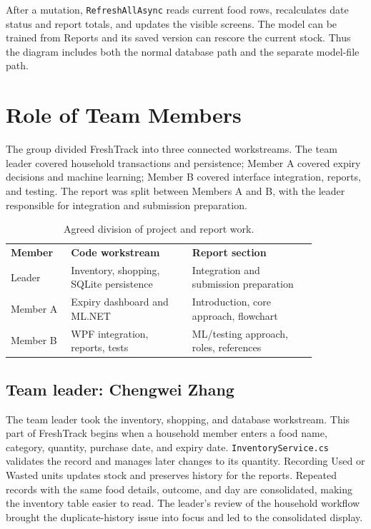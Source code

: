 \documentclass[11pt,a4paper]{article}
\begin{document}
After a mutation, \texttt{RefreshAllAsync} reads current food rows, recalculates date status and report totals, and updates the visible screens. The model can be trained from Reports and its saved version can rescore the current stock. Thus the diagram includes both the normal database path and the separate model-file path.

\section{Role of Team Members}

The group divided FreshTrack into three connected workstreams. The team leader covered household transactions and persistence; Member A covered expiry decisions and machine learning; Member B covered interface integration, reports, and testing. The report was split between Members A and B, with the leader responsible for integration and submission preparation.

\begin{table}[htbp]
\centering\small
\renewcommand{\arraystretch}{1.4}
\begin{tabular}{p{0.16\linewidth}p{0.34\linewidth}p{0.35\linewidth}}
\rowcolor{forest}\color{white}\bfseries Member & \color{white}\bfseries Code workstream & \color{white}\bfseries Report section \\
\rowcolor{mint}Leader & Inventory, shopping, SQLite persistence & Integration and submission preparation \\
Member A & Expiry dashboard and ML.NET & Introduction, core approach, flowchart \\
\rowcolor{mint}Member B & WPF integration, reports, tests & ML/testing approach, roles, references \\
\end{tabular}
\caption{Agreed division of project and report work.}
\end{table}

\subsection*{Team leader: Chengwei Zhang}

The team leader took the inventory, shopping, and database workstream. This part of FreshTrack begins when a household member enters a food name, category, quantity, purchase date, and expiry date. \texttt{InventoryService.cs} validates the record and manages later changes to its quantity. Recording Used or Wasted units updates stock and preserves history for the reports. Repeated records with the same food details, outcome, and day are consolidated, making the inventory table easier to read. The leader's review of the household workflow brought the duplicate-history issue into focus and led to the consolidated display.
\end{document}
